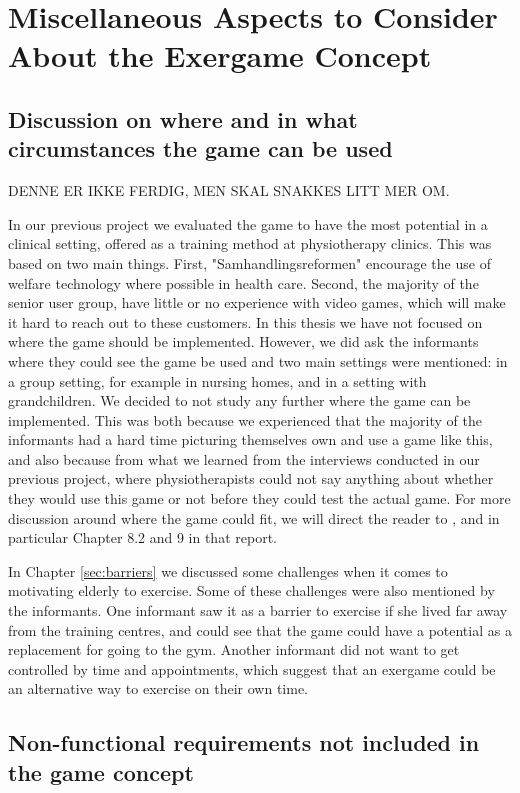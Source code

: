 \section{Miscellaneous Aspects to Consider About the Exergame Concept}
\label{sec:misc}

\subsection{Discussion on where and in what circumstances the game can be used}
DENNE ER IKKE FERDIG, MEN SKAL SNAKKES LITT MER OM.
\label{subsec:whatwhere}

In our previous project \cite{project} we evaluated the game to have the most potential in a clinical setting, offered as a training method at physiotherapy clinics. This was based on two main things. First, "Samhandlingsreformen" encourage the use of welfare technology where possible in health care. Second, the majority of the senior user group, have little or no experience with video games, which will make it hard to reach out to these customers. In this thesis we have not focused on where the game should be implemented. However, we did ask the informants where they could see the game be used and two main settings were mentioned: in a group setting, for example in nursing homes, and in a setting with grandchildren. We decided to not study any further where the game can be implemented. This was both because we experienced that the majority of the informants had a hard time picturing themselves own and use a game like this, and also because from what we learned from the interviews conducted in our previous project, where physiotherapists could not say anything about whether they would use this game or not before they could test the actual game. For more discussion around where the game could fit, we will direct the reader to \cite{project}, and in particular Chapter 8.2 and 9 in that report. 

In Chapter \ref{sec:barriers} we discussed some challenges when it comes to motivating elderly to exercise. Some of these challenges were also mentioned by the informants. One informant saw it as a barrier to exercise if she lived far away from the training centres, and could see that the game could have a potential as a replacement for going to the gym. Another informant did not want to get controlled by time and appointments, which suggest that an exergame could be an alternative way to exercise on their own time. 

\subsection{Non-functional requirements not included in the game concept}

